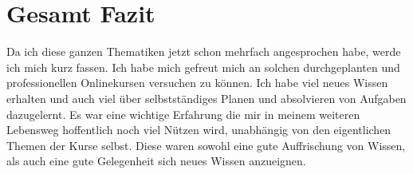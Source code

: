 \documentclass[12pt,a4paper,bibliography=totocnumbered,listof=totocnumbered]{scrartcl}
\begin{document}
\pagebreak
\section{Gesamt Fazit}
Da ich diese ganzen Thematiken jetzt schon mehrfach angesprochen habe, werde ich mich kurz fassen. 
Ich habe mich gefreut mich an solchen durchgeplanten und professionellen Onlinekursen versuchen zu können. Ich habe viel neues Wissen erhalten und auch viel über selbstständiges Planen und absolvieren von Aufgaben dazugelernt. Es war eine wichtige Erfahrung die mir in meinem weiteren Lebensweg hoffentlich noch viel Nützen wird, unabhängig von den eigentlichen Themen der Kurse selbst. Diese waren sowohl eine gute Auffrischung von Wissen, als auch eine gute Gelegenheit sich neues Wissen anzueignen. 
 
\end{document}
